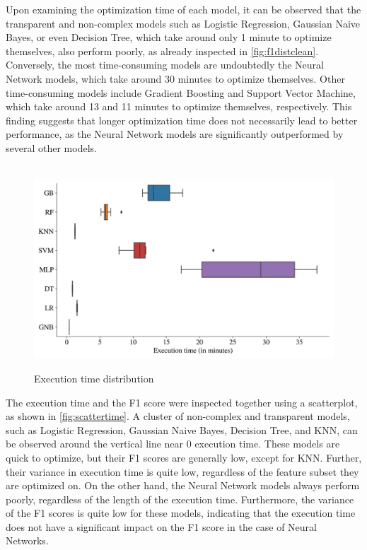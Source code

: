         Upon examining the optimization time of each model, it can be observed that the transparent and non-complex models such as Logistic Regression, Gaussian Naive Bayes, or even Decision Tree, which take around only 1 minute to optimize themselves, also perform poorly, as already inspected in \autoref{fig:f1distclean}.
        Conversely, the most time-consuming models are undoubtedly the Neural Network models, which take around 30 minutes to optimize themselves. Other time-consuming models include Gradient Boosting and Support Vector Machine, which take around 13 and 11 minutes to optimize themselves, respectively.
        This finding suggests that longer optimization time does not necessarily lead to better performance, as the Neural Network models are significantly outperformed by several other models.
        \begin{figure}[H]
            \centering
            \caption{Execution time distribution}\vspace{0.5em}
            \label{fig:timedist}\
            \includegraphics[width=140mm]{Figures/EXECUTION_TIME_Distribution.jpg}
            \centering{\begin{source}Author's results in Python\end{source}}\vspace{-1em}
        \end{figure}
        
        The execution time and the F1 score were inspected together using a scatterplot, as shown in \autoref{fig:scattertime}.
        A cluster of non-complex and transparent models, such as Logistic Regression, Gaussian Naive Bayes, Decision Tree, and KNN, can be observed around the vertical line near 0 execution time. These models are quick to optimize, but their F1 scores are generally low, except for KNN.
        Further, their variance in execution time is quite low, regardless of the feature subset they are optimized on.
        On the other hand, the Neural Network models always perform poorly, regardless of the length of the execution time. Furthermore, the variance of the F1 scores is quite low for these models, indicating that the execution time does not have a significant impact on the F1 score in the case of Neural Networks.
        
